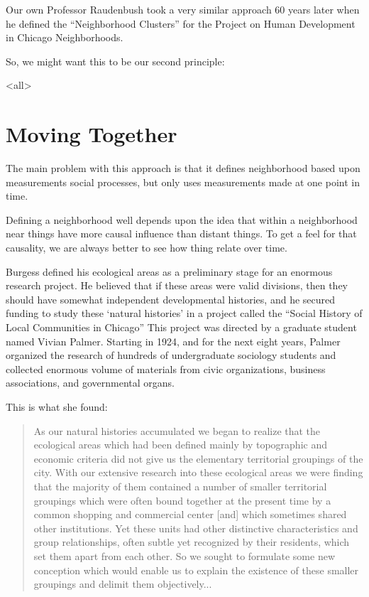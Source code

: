 {Our own Professor Raudenbush took a very similar approach 60 years
later when he defined the ``Neighborhood Clusters'' for the Project on
Human Development in Chicago Neighborhoods.

So, we might want this to be our second principle: 

\begin{figure}[h!]
\centering
{}
\end{figure}

\mode<all>{
\blackout{}
}    

\section{Moving Together}

The main problem with this approach is that it defines neighborhood
based upon measurements social processes, but only uses measurements
made at one point in time.

Defining a neighborhood well depends upon the idea that within a
neighborhood near things have more causal influence than distant
things. To get a feel for that causality, we are always better to see
how thing relate over time.

Burgess defined his ecological areas as a preliminary stage for an
enormous research project. He believed that if these areas were valid
divisions, then they should have somewhat independent developmental
histories, and he secured funding to study these `natural histories'
in a project called the ``Social History of Local Communities in
Chicago'' This project was directed by a graduate student named
Vivian Palmer. Starting in 1924, and for the next eight years, Palmer
organized the research of hundreds of undergraduate sociology students
and collected enormous volume of materials from civic organizations,
business associations, and governmental organs.

This is what she found:

\begin{quote}
  As our natural histories accumulated we began to realize that the
  ecological areas which had been defined mainly by topographic and
  economic criteria did not give us the elementary territorial
  groupings of the city. With our extensive research into these
  ecological areas we were finding that the majority of them contained
  a number of smaller territorial groupings which were often bound
  together at the present time by a common shopping and commercial
  center [and] which sometimes shared other institutions. Yet these
  units had other distinctive characteristics and group relationships,
  often subtle yet recognized by their residents, which set them apart
  from each other. So we sought to formulate some new conception which
  would enable us to explain the existence of these smaller groupings
  and delimit them objectively...


\end{quote}}
